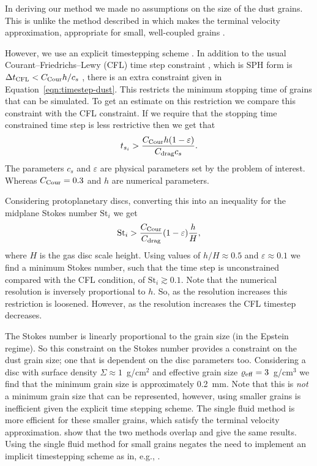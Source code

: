 \documentclass[fleqn,usenatbib]{mnras}
\begin{document}
In deriving our method we made no assumptions on the size of the dust grains.
This is unlike the method described in \citet{Hutchison2018MNRAS.476.2186H}
which makes the terminal velocity approximation, appropriate for small,
well-coupled grains \citep{Youdin2005ApJ...620..459Y}.

However, we use an explicit timestepping scheme
\citep{Price2018PASA...35...31P}. In addition to the usual
Courant–Friedrichs–Lewy (CFL) time step constraint
\citep{Courant1928MatAn.100...32C}, which is SPH form is \(\Delta t_{\rm CFL} <
C_{\rm Cour} h/c_s\) \citep{Price2018PASA...35...31P}, there is an extra
constraint given in Equation~\ref{eqn:timestep-dust}. This restricts the minimum
stopping time of grains that can be simulated. To get an estimate on this
restriction we compare this constraint with the CFL constraint. If we require
that the stopping time constrained time step is less restrictive then we get
that
%
\begin{align}
   t_{s_i} > \frac{C_{\rm Cour} h (1 - \varepsilon)}{C_{\rm drag} c_s}.
\end{align}
%
The parameters \(c_s\) and \(\varepsilon\) are physical parameters set by the
problem of interest. Whereas \(C_{\rm Cour} = 0.3\) and \(h\) are numerical
parameters.

Considering protoplanetary discs, converting this into an inequality for the
midplane Stokes number \(\mathrm{St}_i\) we get
%
\begin{align}
   \mathrm{St}_i > \frac{C_{\rm Cour}}{C_{\rm drag}} (1 - \varepsilon) \frac{h}{H},
\end{align}
%
where \(H\) is the gas disc scale height. Using values of \(h/H \approx 0.5\)
and \(\varepsilon \approx 0.1\) we find a minimum Stokes number, such that the
time step is unconstrained compared with the CFL condition, of \(\mathrm{St}_i
\gtrsim 0.1\). Note that the numerical resolution is inversely proportional to
\(h\). So, as the resolution increases this restriction is loosened. However, as
the resolution increases the CFL timestep decreases.

The Stokes number is linearly proportional to the grain size (in the Epstein
regime). So this constraint on the Stokes number provides a constraint on the
dust grain size; one that is dependent on the disc parameters too. Considering a
disc with surface density \(\Sigma \approx 1\)~g/cm\({}^2\) and effective grain
size \(\varrho_{\rm eff} = 3\)~g/cm\({}^3\) we find that the minimum grain size
is approximately 0.2~mm. Note that this is \emph{not} a minimum grain size that
can be represented, however, using smaller grains is inefficient given the
explicit time stepping scheme. The single fluid method is more efficient for
these smaller grains, which satisfy the terminal velocity approximation.
\citet{Cuello2019MNRAS.483.4114C} show that the two methods overlap and give the
same results. Using the single fluid method for small grains negates the need to
implement an implicit timestepping scheme as in, e.g.,
\citet{Loren-Aguilar2014MNRAS.443..927L, Loren-Aguilar2015MNRAS.454.4114L}.
\end{document}
